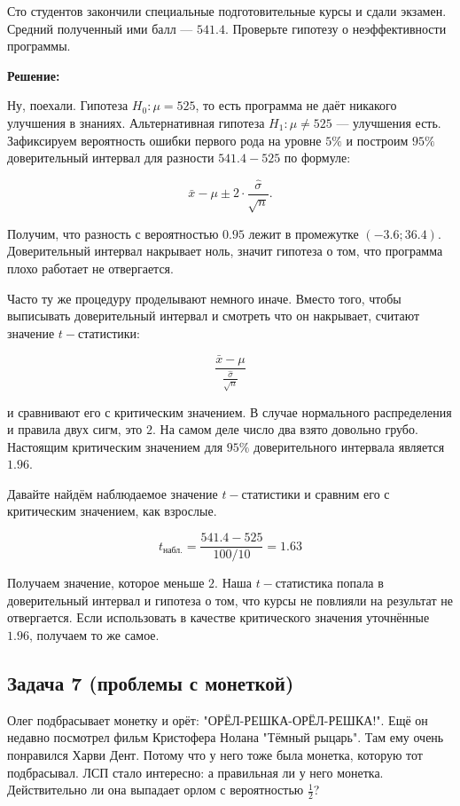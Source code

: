 \documentclass[12pt, a4paper, oneside]{article}
\begin{document}
Сто студентов закончили специальные подготовительные курсы и сдали экзамен. Средний полученный ими балл —  $541.4$. Проверьте гипотезу о неэффективности программы.

\textbf{Решение:} 

Ну, поехали. Гипотеза $H_0:  \mu = 525$, то есть программа не даёт никакого улучшения в знаниях. Альтернативная гипотеза $H_1: \mu \ne 525$ --- улучшения есть. Зафиксируем вероятность ошибки первого рода на уровне $5\%$ и построим $95\%$ доверительный интервал для разности $541.4 - 525$ по формуле: 

\[ 
\bar x  - \mu  \pm  2 \cdot \frac{\hat \sigma}{\sqrt{n}}.
\] 

Получим, что разность с вероятностью $0.95$ лежит в промежутке $(-3.6; 36.4)$. Доверительный интервал накрывает ноль, значит гипотеза о том, что программа плохо работает не отвергается. 

Часто ту же процедуру проделывают немного иначе. Вместо того, чтобы выписывать доверительный интервал и смотреть что он накрывает, считают значение $t-$статистики: 

\[  
\frac{\bar x - \mu}{\frac{\hat \sigma}{\sqrt{n}}}
\]

и сравнивают его с критическим значением. В случае нормального распределения и правила двух сигм, это $2$. На самом деле число два взято довольно грубо. Настоящим критическим значением для $95\%$ доверительного интервала является $1.96$.  

Давайте найдём наблюдаемое значение $t-$статистики и сравним его с критическим значением, как взрослые. 

\[
t_{\text{набл.}}= \frac{541.4 - 525}{100/10} = 1.63
\]

Получаем значение, которое меньше $2$. Наша $t-$статистика попала в доверительный интервал и гипотеза о том, что курсы не повлияли на результат не отвергается. Если использовать в качестве критического значения уточнённые $1.96$, получаем то же самое. 



\subsection*{Задача 7 (проблемы с монеткой)}

Олег подбрасывает монетку и орёт: "ОРЁЛ-РЕШКА-ОРЁЛ-РЕШКА!". Ещё он недавно посмотрел фильм Кристофера Нолана "Тёмный рыцарь". Там ему очень понравился Харви Дент. Потому что у него тоже была монетка, которую тот подбрасывал. ЛСП стало интересно: а правильная ли у него монетка. Действительно ли она выпадает орлом с вероятностью $\frac{1}{2}$? 
\end{document}
